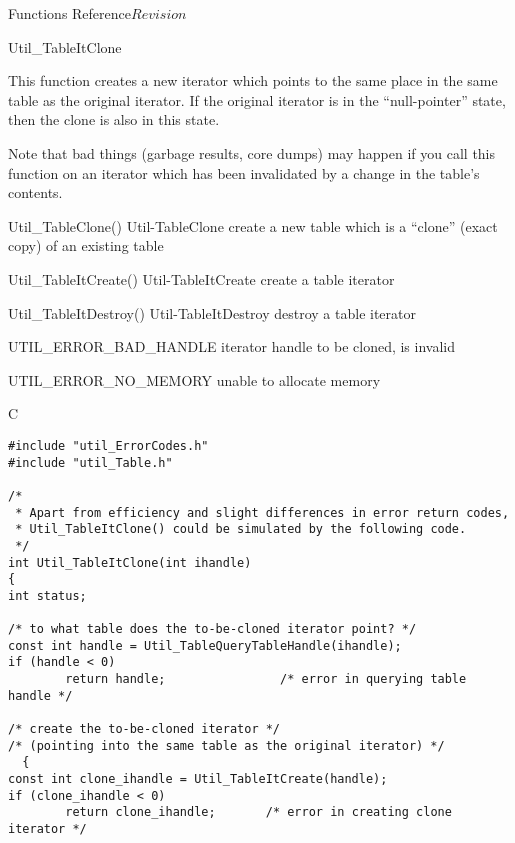 \begin{cactuspart}{ Functions Reference}{}{$Revision$}
\begin{FunctionDescription}{Util\_TableItClone}
\begin{Discussion}
This function creates a new iterator which points to the same place
in the same table as the original iterator.  If the original iterator
is in the ``null-pointer'' state, then the clone is also in this state.

Note that bad things (garbage results, core dumps) may happen if
you call this function on an iterator which has been invalidated
by a change in the table's contents.
\end{Discussion}

\begin{SeeAlsoSection}
\begin{SeeAlso2} {Util\_TableClone()} {Util-TableClone}
create a new table which is a ``clone'' (exact copy) of an existing
table
\end{SeeAlso2}
\begin{SeeAlso2} {Util\_TableItCreate()} {Util-TableItCreate}
create a table iterator
\end{SeeAlso2}
\begin{SeeAlso2} {Util\_TableItDestroy()} {Util-TableItDestroy}
destroy a table iterator
\end{SeeAlso2}
\end{SeeAlsoSection}

\begin{ErrorSection}
\begin{Error}{UTIL\_ERROR\_BAD\_HANDLE}
iterator handle to be cloned, is invalid
\end{Error}
\begin{Error}{UTIL\_ERROR\_NO\_MEMORY}
unable to allocate memory
\end{Error}
\end{ErrorSection}

\begin{ExampleSection}
\begin{Example}{C}
\begin{verbatim}
#include "util_ErrorCodes.h"
#include "util_Table.h"

/*
 * Apart from efficiency and slight differences in error return codes,
 * Util_TableItClone() could be simulated by the following code.
 */
int Util_TableItClone(int ihandle)
{
int status;

/* to what table does the to-be-cloned iterator point? */
const int handle = Util_TableQueryTableHandle(ihandle);
if (handle < 0)
        return handle;                /* error in querying table handle */

/* create the to-be-cloned iterator */
/* (pointing into the same table as the original iterator) */
  {
const int clone_ihandle = Util_TableItCreate(handle);
if (clone_ihandle < 0)
        return clone_ihandle;       /* error in creating clone iterator */


\end{verbatim}
\end{Example}
\end{ExampleSection}
\end{FunctionDescription}
\end{cactuspart}

